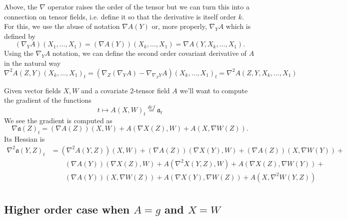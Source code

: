 \documentclass{article}
\begin{document}
Above, the $\nabla$ operator raises the order of the tensor but we can turn this into a connection
on tensor fields, i.e. define it so that the derivative is itself order $k$.
For this, we use the abuse of notation $\nabla A(Y)$ or, more properly,
$\nabla_YA$ which is defined by
$$
(\nabla_YA)(X_1,\dots, X_1) = (\nabla A(Y))(X_k,\dots, X_1) = \nabla A(Y, X_k, \dots, X_1).
$$
Using the $\nabla_YA$ notation, we can define the second order covariant derivative of $A$ in the natural way
$$
\nabla^2 A(Z,Y)(X_k, \dots, X_1)_t = (\nabla_Z(\nabla_YA) - \nabla_{\nabla_ZY}A)(X_k, \dots, X_1)_t = \nabla^2 A(Z, Y, X_k, \dots, X_1)
$$

Given vector fields $X, W$ and a covariate 2-tensor field $A$ we'll want to compute the gradient of the functions
$$
t \mapsto A(X,W)_t \overset{def}{=} \mathfrak{a}_t
$$
We see the gradient is computed as
$$
\nabla \mathfrak{a}(Z)_t = (\nabla A(Z))(X, W) + A(\nabla X(Z), W) + A(X, \nabla W(Z)).
$$
Its Hessian is
$$
\begin{aligned}
  \nabla^2 \mathfrak{a}(Y, Z)_t &= (\nabla^2 A(Y,Z))(X, W) + (\nabla A(Z))(\nabla X(Y), W) + (\nabla A(Z))(X, \nabla W(Y)) + \\
& \qquad  (\nabla A(Y))(\nabla X(Z), W) + A(\nabla^2 X(Y, Z), W) + A(\nabla X(Z), \nabla W(Y)) + \\
& \qquad  (\nabla A(Y))(X, \nabla W(Z)) + A(\nabla X(Y), \nabla W(Z)) + A(X, \nabla^2 W(Y, Z))  \\
\end{aligned}
$$

\subsection{Higher order case when $A=g$ and $X=W$}
\end{document}
